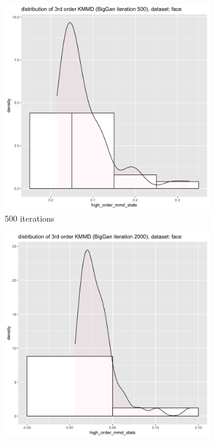\documentclass{article}
\begin{document}
\begin{figure}[h!]
    \caption{Dataset Face}
     \centering
     \begin{subfigure}[b]{0.3\textwidth}
         \centering
         \includegraphics[width=\textwidth]{kmmd_figures/biggan_face_highdist_500.png}
         \caption{500 iterations}
     \end{subfigure}
     \hfill
     \begin{subfigure}[b]{0.3\textwidth}
         \centering
         \includegraphics[width=\textwidth]{kmmd_figures/biggan_face_highdist_2000.png}

\end{subfigure}
\end{figure}
\end{document}
